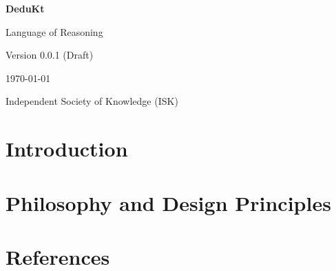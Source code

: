 \documentclass[11pt,oneside,a4paper]{book}
\theoremstyle{definition}
\theoremstyle{plain}
\theoremstyle{remark}
\begin{document}
    \begin{titlepage}
        \centering
        \vspace*{2cm}

        {\Huge\bfseries DeduKt \par}
        \vspace{1cm}
        {\Large Language of Reasoning \par}
        \vspace{2cm}

        {\Large Version 0.0.1 (Draft)\par}
        \vspace{0.5cm}
        {\large \today \par}

        \vfill

        {\Large Independent Society of Knowledge (ISK) \par}

    \end{titlepage}

    \tableofcontents


    
    \newpage
    
    \newpage
    
    \newpage
    
    \newpage
    
    \newpage
    
    \newpage
    

    \chapter{Introduction}\label{ch:introduction}
    
    
    
    
    
    

    \chapter{Philosophy and Design Principles}\label{ch:philosophy-and-design-principles}


    \chapter{References}\label{ch:references}
    \printbibliography
\end{document}

